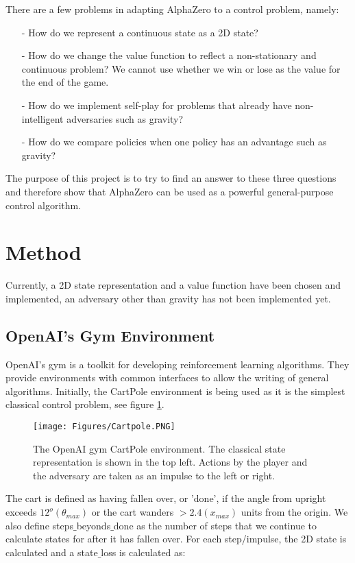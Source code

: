 \documentclass[12pt]{article}
\begin{document}
There are a few problems in adapting AlphaZero to a control problem, namely:
\begin{itemize}
   \item[-] How do we represent a continuous state as a 2D state?
   \item[-] How do we change the value function to reflect a non-stationary and continuous problem? We cannot use whether we win or lose as the value for the end of the game.
   \item[-] How do we implement self-play for problems that already have non-intelligent adversaries such as gravity?
   \item[-] How do we compare policies when one policy has an advantage such as gravity? 
\end{itemize}

The purpose of this project is to try to find an answer to these three questions and therefore show that AlphaZero can be used as a powerful general-purpose control algorithm.

\section{Method}

Currently, a 2D state representation and a value function have been chosen and implemented, an adversary other than gravity has not been implemented yet.

\subsection{OpenAI's Gym Environment}

OpenAI's gym is a toolkit for developing reinforcement learning algorithms. They provide environments with common interfaces to allow the writing of general algorithms. Initially, the CartPole environment is being used as it is the simplest classical control problem, see figure \ref{fig:cartpole}.

\begin{figure}[H]
   \centering
   \texttt{[image: Figures/Cartpole.PNG]}
   \caption{\label{fig:cartpole} The OpenAI gym CartPole environment. The classical state representation is shown in the top left. Actions by the player and the adversary are taken as an impulse to the left or right.}
\end{figure}

The cart is defined as having fallen over, or 'done', if the angle from upright exceeds $12^o (\theta_{max})$ or the cart wanders $> 2.4 (x_{max})$ units from the origin. We also define steps$\_$beyonds$\_$done as the number of steps that we continue to calculate states for after it has fallen over. For each step/impulse, the 2D state is calculated and a state$\_$loss is calculated as:
\end{document}
